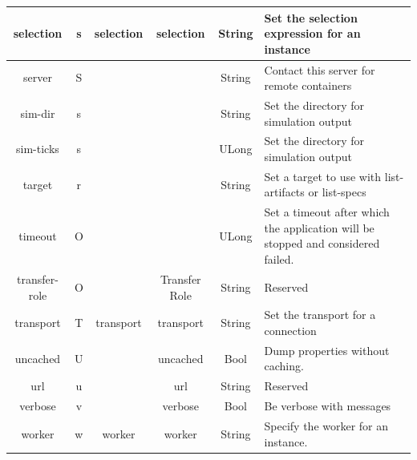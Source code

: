 \documentclass[10pt, a4paper, oneside]{article}
\renewcommand\_{\textunderscore\allowbreak} %
\begin{document}
\begin{longtable} {| c| c| c |c|c|p{5cm}|}
\hline
selection & s & selection & selection & String & Set the selection expression  for an instance\\
\hline
server & S & {} & {} & String & Contact this server for remote containers\\
\hline 
sim-dir & s & {} & {} & String & Set the directory for simulation output\\
\hline 
sim-ticks & s & {} & {} & ULong & Set the directory for simulation output\\
\hline 
target & r & {} & {} & String & Set a target to use with list-artifacts or list-specs\\
\hline 
timeout & O & {} & {} & ULong & Set a timeout after which the application will be stopped and considered failed.\\
\hline 
transfer-role & O & {} & Transfer Role & String & Reserved\\
\hline
transport & T & transport & transport & String & Set the transport for a connection\\
\hline
uncached & U & {} & uncached & Bool & Dump properties without caching.\\
\hline
url&u&{}&url&String&Reserved\\
\hline
verbose & v &{}&verbose&Bool&Be verbose with messages\\
\hline
worker&w&worker&worker&String&Specify the worker for an instance.\\
\hline
\end{longtable}

\newpage
\end{document}
